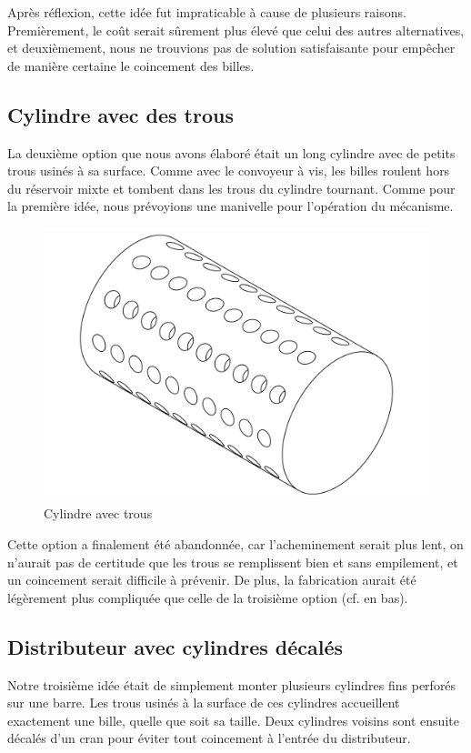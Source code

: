 Après réflexion, cette idée fut impraticable à cause de plusieurs raisons. Premièrement, le coût serait sûrement plus élevé que celui des autres alternatives, et deuxièmement, nous ne trouvions pas de solution satisfaisante pour empêcher de manière certaine le coincement des billes.

\subsection{Cylindre avec des trous}
La deuxième option que nous avons élaboré était un long cylindre avec de petits trous usinés à sa surface. Comme avec le convoyeur à vis, les billes roulent hors du réservoir mixte et tombent dans les trous du cylindre tournant. Comme pour la première idée, nous prévoyions une manivelle pour l'opération du mécanisme.

\begin{figure}
    \centering
    \includegraphics[width=\textwidth]{Graphics/Roue/DRAWING_PROTOTYP_CYLINDRE.pdf}
    \caption{Cylindre avec trous}
\end{figure}

Cette option a finalement été abandonnée, car l'acheminement serait plus lent, on n'aurait pas de certitude que les trous se remplissent bien et sans empilement, et un coincement serait difficile à prévenir. De plus, la fabrication aurait été légèrement plus compliquée que celle de la troisième option (cf. en bas).

\subsection{Distributeur avec cylindres décalés}
Notre troisième idée était de simplement monter plusieurs cylindres fins perforés sur une barre. Les trous usinés à la surface de ces cylindres accueillent exactement une bille, quelle que soit sa taille. Deux cylindres voisins sont ensuite décalés d'un cran pour éviter tout coincement à l'entrée du distributeur.

